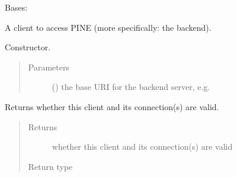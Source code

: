 \documentclass[letterpaper,10pt,english]{sphinxmanual}
\begin{document}
\begin{fulllineitems}
\label{\detokenize{autoapi/pine/client/client/index:pine.client.client.PineClient}}
Bases: {\hyperref[\detokenize{autoapi/pine/client/client/index:pine.client.client.BaseClient}]{}}

A client to access PINE (more specifically: the backend).

Constructor.
\begin{quote}\begin{description}
\item[{Parameters}] \leavevmode
{} () \textendash{} the base URI for the backend server, e.g. 

\end{description}\end{quote}

\begin{fulllineitems}
\label{\detokenize{autoapi/pine/client/client/index:pine.client.client.PineClient.is_valid}}
Returns whether this client and its connection(s) are valid.
\begin{quote}\begin{description}
\item[{Returns}] \leavevmode
whether this client and its connection(s) are valid

\item[{Return type}] \leavevmode
{}

\end{description}\end{quote}

\end{fulllineitems}


\end{fulllineitems}
\end{document}
